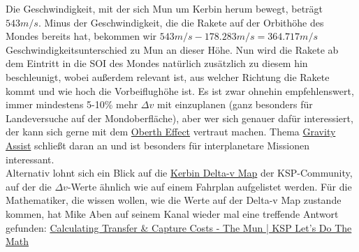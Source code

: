 \documentclass[12pt,paper=A4,numbers=noenddot,bibliography=totoc,listof=totoc,DIV=11,BCOR=1mm]{scrreprt}
\newcommand{\gq}[1]{\glqq #1\grqq} %
\begin{document}
\begin{enumerate}
Die Geschwindigkeit, mit der sich Mun um Kerbin herum bewegt, beträgt $543m/s$.
Minus der Geschwindigkeit, die die Rakete auf der Orbithöhe des Mondes bereits hat, bekommen wir
$543m/s - 178.283m/s = 364.717m/s$ Geschwindigkeitsunterschied zu Mun an dieser Höhe.
Nun wird die Rakete ab dem Eintritt in die SOI des Mondes natürlich zusätzlich zu diesem hin beschleunigt, wobei außerdem relevant ist, aus welcher Richtung die Rakete kommt und wie hoch die \gq{Vorbeiflughöhe} ist. Es ist zwar ohnehin empfehlenswert, immer mindestens 5-10\% mehr $\Delta v$ mit einzuplanen (ganz besonders für Landeversuche auf der Mondoberfläche), aber wer sich genauer dafür interessiert, der kann sich gerne mit dem \href{https://youtu.be/ouJiNZ1pUv8}{Oberth Effect} vertraut machen. Thema \href{https://youtu.be/16jr7WWGSxo}{Gravity Assist} schließt daran an und ist besonders für interplanetare Missionen interessant.\\
Alternativ lohnt sich ein Blick auf die \href{https://wiki.kerbalspaceprogram.com/wiki/File:KerbinDeltaVMap.png}{Kerbin Delta-v Map} der KSP-Com\-mu\-ni\-ty, auf der die $\Delta v$-Werte ähnlich wie auf einem Fahrplan aufgelistet werden. Für die Mathematiker, die wissen wollen, wie die Werte auf der Delta-v Map zustande kommen, hat Mike Aben auf seinem Kanal wieder mal eine treffende Antwort gefunden: \href{https://youtu.be/rRP5doigXSM}{Calculating Transfer \& Capture Costs - The Mun | KSP Let's Do The Math}\\


\end{enumerate}
\end{document}
